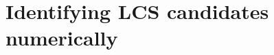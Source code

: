 \section{Identifying LCS candidates numerically}
\label{sec:identifying_lcs_candidates_numerically}

